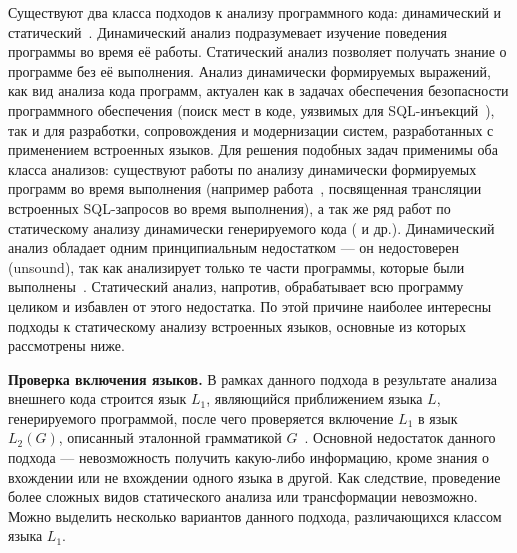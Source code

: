 Существуют два класса подходов к анализу программного кода: динамический и статический~\cite{StaticDynamicAnalysis}. Динамический анализ подразумевает изучение поведения программы во время её работы. Статический анализ позволяет получать знание о программе без её выполнения. Анализ динамически формируемых выражений, как вид анализа кода программ, актуален как в задачах обеспечения безопасности программного обеспечения (поиск мест в коде, уязвимых для SQL-инъекций~\cite{SQLInjection}), так и для разработки, сопровождения и модернизации систем, разработанных с применением встроенных языков. Для решения подобных задач применимы оба класса анализов: существуют работы по анализу динамически формируемых программ во время выполнения (например работа~\cite{DynamicDSQLTranslation}, посвященная трансляции встроенных SQL-запросов во время выполнения), а так же ряд работ по статическому анализу динамически генерируемого кода (\cite{Alvor1,JSA,PHPSA,RegOverApprox}  и др.). Динамический анализ обладает одним принципиальным недостатком --- он недостоверен (unsound), так как анализирует только те части программы, которые были выполнены~\cite{StaticDynamicAnalysis}. Статический анализ, напротив, обрабатывает всю программу целиком и избавлен от этого недостатка. По этой причине наиболее интересны подходы к статическому анализу встроенных языков, основные из которых рассмотрены ниже.

\textbf{Проверка включения языков.} В рамках данного подхода в результате анализа внешнего кода строится язык $L_1$, являющийся приближением языка $L$, генерируемого программой, после чего проверяется включение $L_1$ в язык $L_2(G)$, описанный эталонной грамматикой $G$~\cite{JSA, PHPSA}. Основной недостаток данного подхода --- невозможность получить какую-либо информацию, кроме знания о вхождении или не вхождении одного языка в другой. Как следствие, проведение более сложных видов статического анализа или трансформации невозможно. Можно выделить несколько вариантов данного подхода, различающихся классом языка $L_1$.

